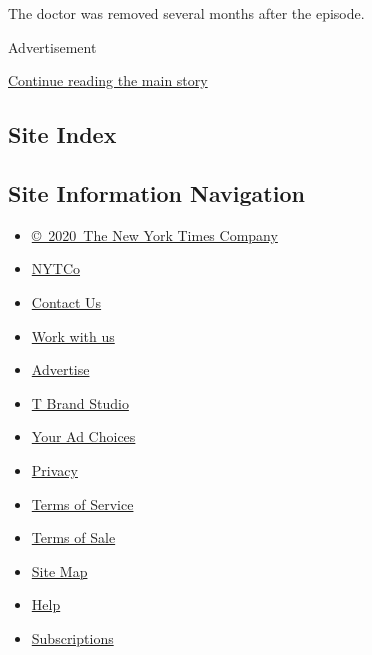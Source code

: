 The doctor was removed several months after the episode.

Advertisement

\protect\hyperlink{after-bottom}{Continue reading the main story}

\hypertarget{site-index}{%
\subsection{Site Index}\label{site-index}}

\hypertarget{site-information-navigation}{%
\subsection{Site Information
Navigation}\label{site-information-navigation}}

\begin{itemize}
\tightlist
\item
  \href{https://help.nytimes.com/hc/en-us/articles/115014792127-Copyright-notice}{©~2020~The
  New York Times Company}
\end{itemize}

\begin{itemize}
\tightlist
\item
  \href{https://www.nytco.com/}{NYTCo}
\item
  \href{https://help.nytimes.com/hc/en-us/articles/115015385887-Contact-Us}{Contact
  Us}
\item
  \href{https://www.nytco.com/careers/}{Work with us}
\item
  \href{https://nytmediakit.com/}{Advertise}
\item
  \href{http://www.tbrandstudio.com/}{T Brand Studio}
\item
  \href{https://www.nytimes.com/privacy/cookie-policy\#how-do-i-manage-trackers}{Your
  Ad Choices}
\item
  \href{https://www.nytimes.com/privacy}{Privacy}
\item
  \href{https://help.nytimes.com/hc/en-us/articles/115014893428-Terms-of-service}{Terms
  of Service}
\item
  \href{https://help.nytimes.com/hc/en-us/articles/115014893968-Terms-of-sale}{Terms
  of Sale}
\item
  \href{https://spiderbites.nytimes.com}{Site Map}
\item
  \href{https://help.nytimes.com/hc/en-us}{Help}
\item
  \href{https://www.nytimes.com/subscription?campaignId=37WXW}{Subscriptions}
\end{itemize}
